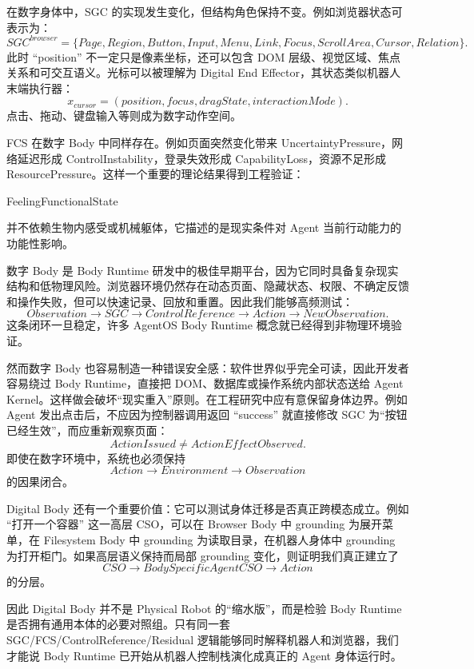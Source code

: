 在数字身体中，SGC 的实现发生变化，但结构角色保持不变。例如浏览器状态可表示为：
\[
SGC^{browser}
=
\{
Page,
Region,
Button,
Input,
Menu,
Link,
Focus,
ScrollArea,
Cursor,
Relation
\}.
\]
此时 ``position'' 不一定只是像素坐标，还可以包含 DOM 层级、视觉区域、焦点关系和可交互语义。光标可以被理解为 Digital End Effector，其状态类似机器人末端执行器：
\[
x_{cursor}
=
(position,focus,dragState,interactionMode).
\]
点击、拖动、键盘输入等则成为数字动作空间。

FCS 在数字 Body 中同样存在。例如页面突然变化带来 UncertaintyPressure，网络延迟形成 ControlInstability，登录失效形成 CapabilityLoss，资源不足形成 ResourcePressure。这样一个重要的理论结果得到工程验证：
\begin{statementbox}
FeelingFunctionalState
\end{statementbox}
并不依赖生物内感受或机械躯体，它描述的是现实条件对 Agent 当前行动能力的功能性影响。

数字 Body 是 Body Runtime 研发中的极佳早期平台，因为它同时具备复杂现实结构和低物理风险。浏览器环境仍然存在动态页面、隐藏状态、权限、不确定反馈和操作失败，但可以快速记录、回放和重置。因此我们能够高频测试：
\[
Observation
\rightarrow
SGC
\rightarrow
ControlReference
\rightarrow
Action
\rightarrow
NewObservation.
\]
这条闭环一旦稳定，许多 AgentOS Body Runtime 概念就已经得到非物理环境验证。

然而数字 Body 也容易制造一种错误安全感：软件世界似乎完全可读，因此开发者容易绕过 Body Runtime，直接把 DOM、数据库或操作系统内部状态送给 Agent Kernel。这样做会破坏“现实重入”原则。在工程研究中应有意保留身体边界。例如 Agent 发出点击后，不应因为控制器调用返回 ``success'' 就直接修改 SGC 为“按钮已经生效”，而应重新观察页面：
\[
ActionIssued
\neq
ActionEffectObserved.
\]
即使在数字环境中，系统也必须保持
\[
Action
\rightarrow
Environment
\rightarrow
Observation
\]
的因果闭合。

Digital Body 还有一个重要价值：它可以测试身体迁移是否真正跨模态成立。例如 ``打开一个容器'' 这一高层 CSO，可以在 Browser Body 中 grounding 为展开菜单，在 Filesystem Body 中 grounding 为读取目录，在机器人身体中 grounding 为打开柜门。如果高层语义保持而局部 grounding 变化，则证明我们真正建立了
\[
CSO
\rightarrow
BodySpecificAgentCSO
\rightarrow
Action
\]
的分层。

因此 Digital Body 并不是 Physical Robot 的“缩水版”，而是检验 Body Runtime 是否拥有通用本体的必要对照组。只有同一套 SGC/FCS/ControlReference/Residual 逻辑能够同时解释机器人和浏览器，我们才能说 Body Runtime 已开始从机器人控制栈演化成真正的 Agent 身体运行时。

